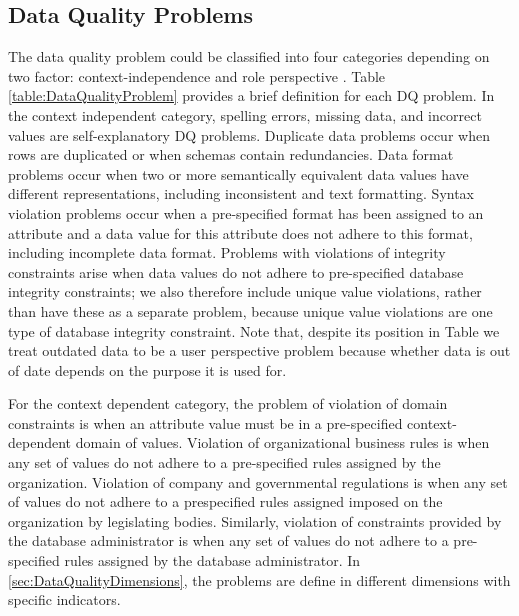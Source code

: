 \documentclass[pdftex,english,oribibl]{llncs}
\begin{document}
\subsection{Data Quality Problems}\label{sec:DataQualityProblems}
The data quality problem could be classified into four categories depending on two factor: context-independence and role perspective \cite{Borek2011AClassficationOfDataQualityAssessmentMethod}.
 Table \ref{table:DataQualityProblem} provides a brief definition for each DQ problem.
 In the context independent category, spelling errors, missing data, and incorrect values are self-explanatory DQ problems.
 Duplicate data problems occur when rows are duplicated or when schemas contain redundancies.
 Data format problems occur when two or more semantically equivalent data values have different representations, including inconsistent and text formatting.
 Syntax violation problems occur when a pre-specified format has been assigned to an attribute and a data value for this attribute does not adhere to this format, including incomplete data format.
 Problems with violations of integrity constraints arise when data values do not adhere to pre-specified database integrity constraints; we also therefore include unique value violations, rather than have these as a separate problem, because unique value violations are one type of database integrity constraint.
 Note that, despite its position in Table we treat outdated data to be a user perspective problem because whether data is out of date depends on the purpose it is used for.

 For the context dependent category, the problem of violation of domain constraints is when an attribute value must be in a pre-specified context-dependent domain of values.
 Violation of organizational business rules is when any set of values do not adhere to a pre-specified rules assigned by the organization.
 Violation of company and governmental regulations is when any set of values do not adhere to a prespecified rules assigned imposed on the organization by legislating bodies.
 Similarly, violation of constraints provided by the database administrator is when any set of values do not adhere to a pre-specified rules assigned by the database administrator. In \ref{sec:DataQualityDimensions}, the problems are define in different dimensions with specific indicators.
\end{document}
